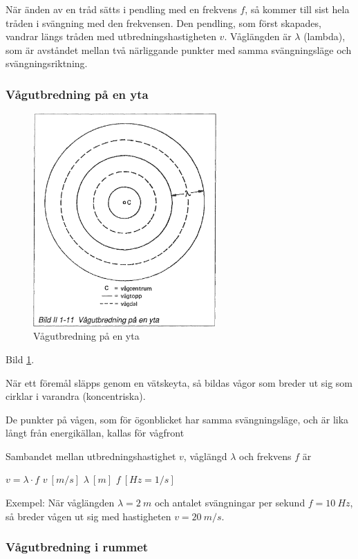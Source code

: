 När änden av en tråd sätts i pendling med en frekvens \(f\), så kommer till
sist hela tråden i svängning med den frekvensen. Den pendling, som först
skapades, vandrar längs tråden med utbredningshastigheten \(v\). Våglängden är
\(\lambda\) (lambda), som är avståndet mellan två närliggande punkter med samma
svängningsläge och svängningsriktning.

\subsubsection{Vågutbredning på en yta}

\begin{figure}[h]
\begin{center}
\includegraphics[width=7cm]{images/bild_2_1-11}
\caption{Vågutbredning på en yta}
\label{fig:BildII1-11}
\end{center}
\end{figure}

Bild \ref{fig:BildII1-11}.

När ett föremål släpps genom en vätskeyta, så bildas vågor som breder ut sig
som cirklar i varandra (koncentriska).

De punkter på vågen, som för ögonblicket har samma svängningsläge, och är lika
långt från energikällan, kallas för vågfront

Sambandet mellan utbredningshastighet \(v\), våglängd \(\lambda\) och frekvens
\(f\) är

\(v = \lambda \cdot f\) \(v\ [m/s]\) \(\lambda\ [m]\) \(f\ [Hz=1/s]\)

Exempel: När våglängden \(\lambda = 2\ m\) och antalet svängningar per sekund
\(f = 10\ Hz\), så breder vågen ut sig med hastigheten \(v = 20\ m/s\).

\subsubsection{Vågutbredning i rummet}

